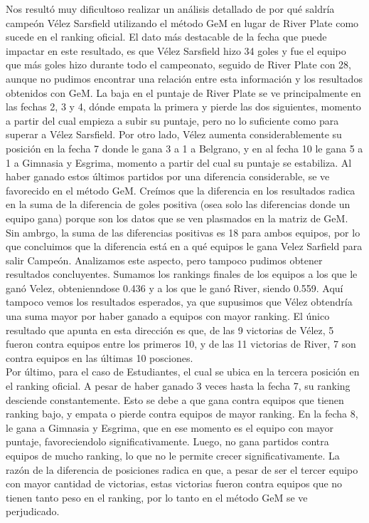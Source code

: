 Nos resultó muy dificultoso realizar un análisis detallado de por qué saldría campeón Vélez Sarsfield utilizando el método GeM en lugar de River Plate como sucede en el ranking oficial. El dato más destacable de la fecha que puede impactar en este resultado, es que Vélez Sarsfield hizo 34 goles y fue el equipo que más goles hizo durante todo el campeonato, seguido de River Plate con 28, aunque no pudimos encontrar una relación entre esta información y los resultados obtenidos con GeM. La baja en el puntaje de River Plate se ve principalmente en las fechas 2, 3 y 4, dónde empata la primera y pierde las dos siguientes, momento a partir del cual empieza a subir su puntaje, pero no lo suficiente como para superar a Vélez Sarsfield. Por otro lado, Vélez aumenta considerablemente su posición en la fecha 7 donde le gana 3 a 1 a Belgrano, y en al fecha 10 le gana 5 a 1 a Gimnasia y Esgrima, momento a partir del cual su puntaje se estabiliza. Al haber ganado estos últimos partidos por una diferencia considerable, se ve favorecido en el método GeM. Creímos que la diferencia en los resultados radica en la suma de la diferencia de goles positiva (osea solo las diferencias donde un equipo gana) porque son los datos que se ven plasmados en la matriz de GeM. Sin ambrgo, la suma de las diferencias positivas es 18 para ambos equipos, por lo que concluimos que la diferencia está en a qué equipos le gana Velez Sarfield para salir Campeón. Analizamos este aspecto, pero tampoco pudimos obtener resultados concluyentes. Sumamos los rankings finales de los equipos a los que le ganó Velez, obtenienndose 0.436 y a los que le ganó River, siendo 0.559. Aquí tampoco vemos los resultados esperados, ya que supusimos que Vélez obtendría una suma mayor por haber ganado a equipos con mayor ranking. El único resultado que apunta en esta dirección es que, de las 9 victorias de Vélez, 5 fueron contra equipos entre los primeros 10, y de las 11 victorias de River, 7 son contra equipos en las últimas 10 posciones. \\

Por último, para el caso de Estudiantes, el cual se ubica en la tercera posición en el ranking oficial.  A pesar de haber ganado 3 veces hasta la fecha 7, su ranking desciende constantemente. Esto se debe a que gana contra equipos que tienen ranking bajo, y empata o pierde contra equipos de mayor ranking. En la fecha 8, le gana a Gimnasia y Esgrima, que en ese momento es el equipo con mayor puntaje, favoreciendolo significativamente. Luego, no gana partidos contra equipos de mucho ranking, lo que no le permite crecer significativamente. La razón de la diferencia de posiciones radica en que, a pesar de ser el tercer equipo con mayor cantidad de victorias, estas victorias fueron contra equipos que no tienen tanto peso en el ranking, por lo tanto en el método GeM se ve perjudicado. \\
\\

